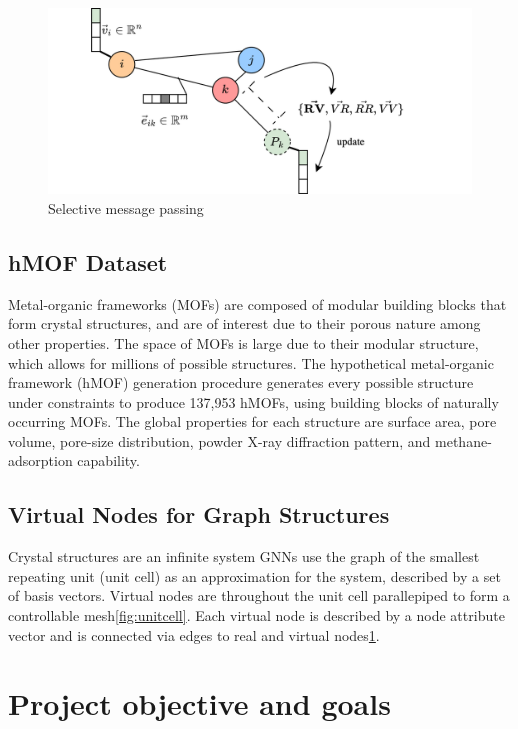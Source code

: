 \documentclass{lxaiproposal}
\begin{document}
\begin{figure}[h]
    \centering
    \includegraphics[scale=0.2]{graph-rep-vn.drawio.png}
    \caption{Selective message passing}
    \label{fig:messagep}
\end{figure}

\subsection*{hMOF Dataset}

Metal-organic frameworks (MOFs) are composed of modular building blocks that form crystal structures, and are of interest due to their porous nature among other properties. The space of  MOFs is large due to their modular structure, which allows for millions of possible structures. The hypothetical metal-organic framework (hMOF) generation procedure generates every possible structure under constraints to produce 137,953 hMOFs, using building blocks of naturally occurring MOFs. The global properties for each structure are surface area, pore volume, pore-size distribution, powder X-ray diffraction pattern, and methane-adsorption capability\cite{wilmer2012large}.

\subsection*{Virtual Nodes for Graph Structures}

Crystal structures are an infinite system GNNs use the graph of the smallest repeating unit (unit cell) as an approximation for the system, described by a set of basis vectors. Virtual nodes are throughout the unit cell parallepiped to form a controllable mesh\ref{fig:unitcell}. Each virtual node is described by a node attribute vector and is connected via edges to real and virtual nodes\ref{fig:messagep}.

\section*{Project objective and goals}
\end{document}
